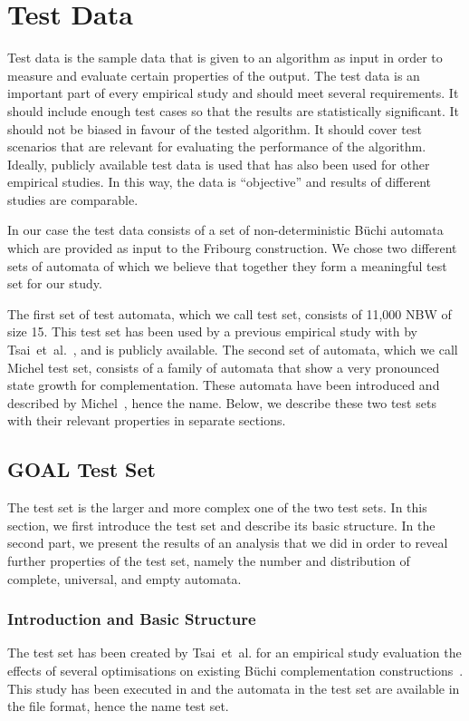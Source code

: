 \section{Test Data}
Test data is the sample data that is given to an algorithm as input in order to measure and evaluate certain properties of the output. The test data is an important part of every empirical study and should meet several requirements. It should include enough test cases so that the results are statistically significant. It should not be biased in favour of the tested algorithm. It should cover test scenarios that are relevant for evaluating the performance of the algorithm. Ideally, publicly available test data is used that has also  been used for other empirical studies. In this way, the data is ``objective'' and results of different studies are comparable.

In our case the test data consists of a set of non-deterministic Büchi automata which are provided as input to the Fribourg construction. We chose two different sets of automata of which we believe that together they form a meaningful test set for our study.

The first set of test automata, which we call \goal{} test set, consists of 11,000 NBW of size 15. This test set has been used by a previous empirical study with \goal{} by Tsai~et~al.~\cite{2011_tsai}, and is publicly available. The second set of automata, which we call Michel test set, consists of a family of automata that show a very pronounced state growth for complementation. These automata have been introduced and described by Michel~\cite{michel1988}, hence the name. Below, we describe these two test sets with their relevant properties in separate sections.


\subsection{GOAL Test Set}
\label{4_goal_testset}
The \goal{} test set is the larger and more complex one of the two test sets. In this section, we first introduce the \goal{} test set and describe its basic structure. In the second part, we present the results of an analysis that we did in order to reveal further properties of the \goal{} test set, namely the number and distribution of complete, universal, and empty automata.

\subsubsection{Introduction and Basic Structure}
The \goal{} test set has been created by Tsai~et~al. for an empirical study evaluation the effects of several optimisations on existing Büchi complementation constructions~\cite{2011_tsai}. This study has been executed in \goal{} and the automata in the test set are available in the \goal{} file format, hence the name \goal{} test set.

